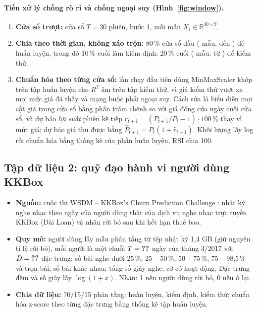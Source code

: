 \paragraph{Tiền xử lý chống rò rỉ và chống ngoại suy (Hình~\ref{fig:window}).}
\begin{enumerate}
  \item \textbf{Cửa sổ trượt:} cửa sổ $T = 30$ phiên, bước 1, mỗi mẫu $X_i \in \mathbb{R}^{30\times 9}$.
  \item \textbf{Chia theo thời gian, không xáo trộn:} 80\,\% cửa sổ đầu ( mẫu, đến
    ) để huấn luyện, trong đó 10\,\% cuối làm kiểm định; 20\,\% cuối ( mẫu,
    từ ) để kiểm thử.
  \item \textbf{Chuẩn hóa theo từng cửa sổ:} lần chạy đầu tiên dùng MinMaxScaler khớp trên tập huấn luyện cho $R^2$ âm trên
    tập kiểm thử, vì giá kiểm thử vượt xa mọi mức giá đã thấy và mạng buộc phải ngoại suy. Cách sửa là biểu diễn mọi cột giá
    trong cửa sổ bằng phần trăm chênh so với giá đóng cửa ngày cuối cửa sổ, và dự báo \emph{lợi suất} phiên kế tiếp
    $r_{t+1} = (P_{t+1}/P_t - 1)\cdot 100\,\%$ thay vì mức giá; dự báo giá thu được bằng $\hat P_{t+1} = P_t(1 + \hat r_{t+1})$.
    Khối lượng lấy log rồi chuẩn hóa bằng thống kê của phần huấn luyện, RSI chia 100.
\end{enumerate}

\subsection{Tập dữ liệu 2: quỹ đạo hành vi người dùng KKBox}

\begin{itemize}
  \item \textbf{Nguồn:} cuộc thi WSDM -- KKBox's Churn Prediction Challenge \cite{kkbox2017}: nhật ký nghe nhạc theo ngày của
    người dùng thật của dịch vụ nghe nhạc trực tuyến KKBox (Đài Loan) và nhãn rời bỏ sau khi hết hạn thuê bao.
  \item \textbf{Quy mô:}  người dùng lấy mẫu phân tầng từ tệp nhật ký 1,4 GB (giữ nguyên tỉ lệ rời bỏ),
    mỗi người là một chuỗi $T = \SL{eda/churn/T}$ ngày của tháng 3/2017 với $D = \SL{eda/churn/D}$ đặc trưng: số bài nghe
    dưới 25\,\%, 25 -- 50\,\%, 50 -- 75\,\%, 75 -- 98,5\,\% và trọn bài; số bài khác nhau; tổng số giây nghe; cờ có hoạt
    động. Đặc trưng đếm và số giây lấy $\log(1 + x)$. Nhãn: 1 nếu người dùng rời bỏ, 0 nếu ở lại.
  \item \textbf{Chia dữ liệu:} 70/15/15 phân tầng:  huấn luyện,  kiểm định,
     kiểm thử; chuẩn hóa z-score theo từng đặc trưng bằng thống kê tập huấn luyện.
\end{itemize}

